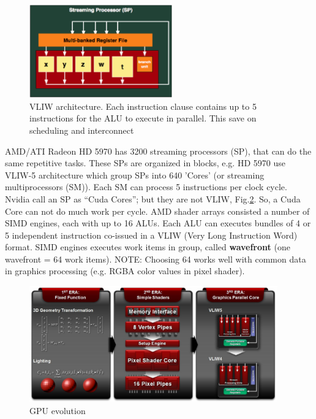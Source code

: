 \begin{figure}[hbt]
  \centerline{\includegraphics[height=4cm,
    angle=0]{./images/VLIW_architecture.eps}}
\caption{VLIW architecture. Each instruction clause contains up to 5
instructions for the ALU to execute in parallel. This save on scheduling and
interconnect}
\label{fig:GPU_VLIW}
\end{figure}


AMD/ATI Radeon HD 5970 has 3200 streaming processors (SP), that can do the same
repetitive tasks. These SPs are organized in blocks, e.g. HD 5970 use VLIW-5
architecture which group SPs into 640 'Cores' (or streaming multiprocessors
(SM)). Each SM can process 5 instructions per clock
cycle. Nvidia call an SP as ``Cuda Cores''; but they are not VLIW,
Fig.\ref{fig:GPU_evolution}. So, a Cuda Core can not do much work per cycle. AMD
shader arrays consisted a number of SIMD engines, each with up to 16 ALUs. Each
ALU can executes bundles of 4 or 5 independent instruction co-issued in a VLIW
(Very Long Instruction Word) format.
SIMD engines executes work items in group, called {\bf wavefront} (one wavefront
= 64 work items). NOTE: Choosing 64 works well with common data in graphics
processing (e.g. RGBA color values in pixel shader).

\begin{figure}[hbt]
  \centerline{\includegraphics[height=5cm,
    angle=0]{./images/GPU_evolution.eps}}
\caption{GPU evolution}
\label{fig:GPU_evolution}
\end{figure}


